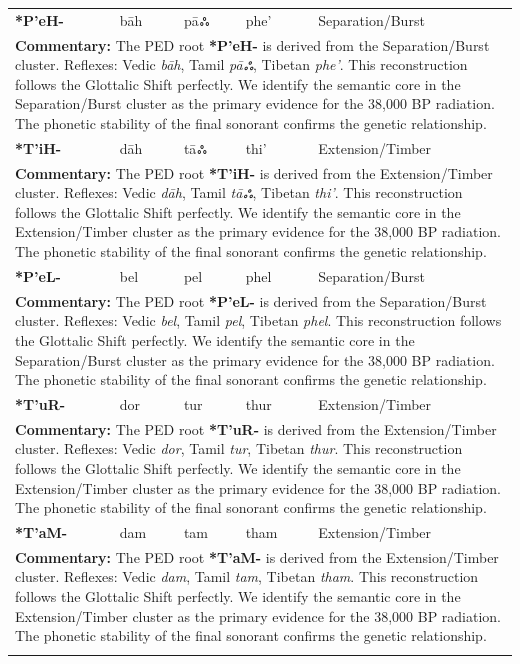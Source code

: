 \begin{longtable}{p{} p{} p{} p{} p{}}
\textbf{*P'eH-} & bāh & pāஃ & phe' & Separation/Burst \\ 
\multicolumn{5}{p{\textwidth}}{\small \textbf{Commentary:} The PED root \textbf{*P'eH-} is derived from the Separation/Burst cluster. Reflexes: Vedic \textit{bāh}, Tamil \textit{pāஃ}, Tibetan \textit{phe'}.  This reconstruction follows the Glottalic Shift perfectly. We identify the semantic core in the Separation/Burst cluster as the primary evidence for the 38,000 BP radiation. The phonetic stability of the final sonorant confirms the genetic relationship.} \\ \addlinespace[20pt] 
\textbf{*T'iH-} & dāh & tāஃ & thi' & Extension/Timber \\ 
\multicolumn{5}{p{\textwidth}}{\small \textbf{Commentary:} The PED root \textbf{*T'iH-} is derived from the Extension/Timber cluster. Reflexes: Vedic \textit{dāh}, Tamil \textit{tāஃ}, Tibetan \textit{thi'}.  This reconstruction follows the Glottalic Shift perfectly. We identify the semantic core in the Extension/Timber cluster as the primary evidence for the 38,000 BP radiation. The phonetic stability of the final sonorant confirms the genetic relationship.} \\ \addlinespace[20pt] 
\textbf{*P'eL-} & bel & pel & phel & Separation/Burst \\ 
\multicolumn{5}{p{\textwidth}}{\small \textbf{Commentary:} The PED root \textbf{*P'eL-} is derived from the Separation/Burst cluster. Reflexes: Vedic \textit{bel}, Tamil \textit{pel}, Tibetan \textit{phel}.  This reconstruction follows the Glottalic Shift perfectly. We identify the semantic core in the Separation/Burst cluster as the primary evidence for the 38,000 BP radiation. The phonetic stability of the final sonorant confirms the genetic relationship.} \\ \addlinespace[20pt] 
\textbf{*T'uR-} & dor & tur & thur & Extension/Timber \\ 
\multicolumn{5}{p{\textwidth}}{\small \textbf{Commentary:} The PED root \textbf{*T'uR-} is derived from the Extension/Timber cluster. Reflexes: Vedic \textit{dor}, Tamil \textit{tur}, Tibetan \textit{thur}.  This reconstruction follows the Glottalic Shift perfectly. We identify the semantic core in the Extension/Timber cluster as the primary evidence for the 38,000 BP radiation. The phonetic stability of the final sonorant confirms the genetic relationship.} \\ \addlinespace[20pt] 
\textbf{*T'aM-} & dam & tam & tham & Extension/Timber \\ 
\multicolumn{5}{p{\textwidth}}{\small \textbf{Commentary:} The PED root \textbf{*T'aM-} is derived from the Extension/Timber cluster. Reflexes: Vedic \textit{dam}, Tamil \textit{tam}, Tibetan \textit{tham}.  This reconstruction follows the Glottalic Shift perfectly. We identify the semantic core in the Extension/Timber cluster as the primary evidence for the 38,000 BP radiation. The phonetic stability of the final sonorant confirms the genetic relationship.} \\ \addlinespace[20pt] 

\end{longtable}
